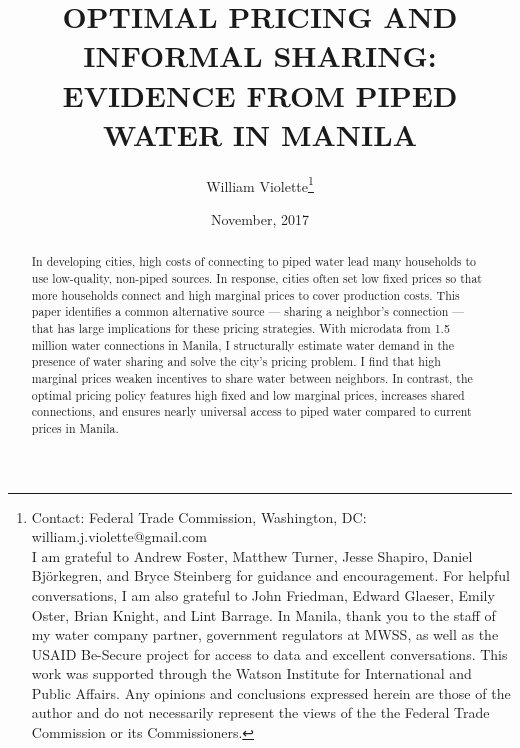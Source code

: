 \documentclass[12pt]{article}
\title{OPTIMAL PRICING AND INFORMAL SHARING: \\ EVIDENCE FROM PIPED WATER IN MANILA}
\author{William Violette\thanks{Contact: Federal Trade Commission, Washington, DC: william.j.violette@gmail.com \\ I am grateful to Andrew Foster, Matthew Turner, Jesse Shapiro, Daniel Bj\"{o}rkegren, and Bryce Steinberg for guidance and encouragement.  For helpful conversations, I am also grateful to John Friedman, Edward Glaeser, Emily Oster, Brian Knight, and Lint Barrage.  In Manila, thank you to the staff of my water company partner, government regulators at MWSS, as well as the USAID Be-Secure project for access to data and excellent conversations.  This work was supported through the Watson Institute for International and Public Affairs.  Any opinions and conclusions expressed herein are those of the author and do not necessarily represent the views of the the Federal Trade Commission or its Commissioners.}
 }
\date{November, 2017}
\begin{document}
\maketitle
\begin{abstract}


	In developing cities, high costs of connecting to piped water lead many households to use low-quality, non-piped sources.  In response, cities often set low fixed prices so that more households connect and high marginal prices to cover production costs.  This paper identifies a common alternative source --- sharing a neighbor's connection --- that has large implications for these pricing strategies.  With microdata from 1.5 million water connections in Manila, I structurally estimate water demand in the presence of water sharing and solve the city's pricing problem.  I find that high marginal prices weaken incentives to share water between neighbors.  In contrast, the optimal pricing policy features high fixed and low marginal prices, increases shared connections, and ensures nearly universal access to piped water compared to current prices in Manila.

























\end{abstract}
\end{document}
